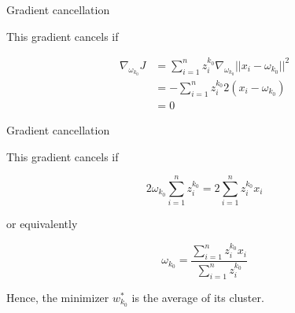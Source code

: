 \documentclass[usenames,dvipsnames]{beamer}
\begin{document}
\begin{frame}{Gradient cancellation}

    This gradient cancels if

    \begin{equation}
        \begin{aligned}
            \label{eq:}
	    \nabla_{\omega_{k_0}}J &= \sum^{n}_{i=1} z_i^{k_0}\nabla_{\omega_{k_0}} ||x_i-\omega_{k_0}||^2\\
	    &= -\sum^{n}_{i=1} z_i^{k_0} 2(x_i-\omega_{k_0}) \\
	    &= 0
        \end{aligned}
    \end{equation}
\end{frame}

\begin{frame}{Gradient cancellation}

    This gradient cancels if

    \begin{equation}
	2\omega_{k_0} \sum^{n}_{i=1} z_i^{k_0} = 2\sum^{n}_{i=1} z_i^{k_0} x_i
    \end{equation}

    or equivalently

    \begin{equation}
        \omega_{k_0} = \frac{\sum^{n}_{i=1} z_i^{k_0} x_i}{\sum^{n}_{i=1} z_i^{k_0}} 
    \end{equation}
    
    Hence, the minimizer $w_{k_0}^*$ is the average of its cluster.
\end{frame}
\end{document}
